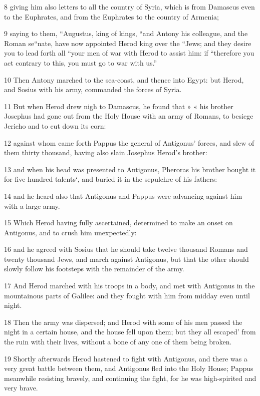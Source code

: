 8 giving him also letters to all the country of Syria, which is from Damascus even to the Euphrates, and from the Euphrates to the country of Armenia; 

9 saying to them, “Augustus, king of kings, “and Antony his colleague, and the Roman se“nate, have now appointed Herod king over the “Jews; and they desire you to lead forth all “your men of war with Herod to assist him: if “therefore you act contrary to this, you must go to war with us.” 

10 Then Antony marched to the sea-coast, and thence into Egypt: but Herod, and Sosius with his army, commanded the forces of Syria. 

11 But when Herod drew nigh to Damascus, he found that » « his brother Josephus had gone out from the Holy House with an army of Romans, to besiege Jericho and to cut down its corn: 

12 against whom came forth Pappus the general of Antigonus’ forces, and slew of them thirty thousand, having also slain Josephus Herod’s brother: 

13 and when his head was presented to Antigonus, Pheroras his brother bought it for five hundred talents‘, and buried it in the sepulchre of his fathers: 

14 and he heard also that Antigonus and Pappus were advancing against him with a large army. 

15 Which Herod having fully ascertained, determined to make an onset on Antigonus, and to crush him unexpectedly: 

16 and he agreed with Sosius that he should take twelve thousand Romans and twenty thousand Jews, and march against Antigonus, but that the other should slowly follow his footsteps with the remainder of the army. 

17 And Herod marched with his troops in a body, and met with Antigonus in the mountainous parts of Galilee: and they fought with him from midday even until night. 

18 Then the army was dispersed; and Herod with some of his men passed the night in a certain house, and the house fell upon them; but they all escaped’ from the ruin with their lives, without a bone of any one of them being broken. 

19 Shortly afterwards Herod hastened to fight with Antigonus, and there was a very great battle between them, and Antigonus fled into the Holy House; Pappus meanwhile resisting bravely, and continuing the fight, for he was high-spirited and very brave. 

